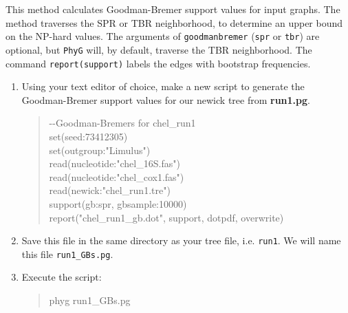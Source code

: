 \documentclass[11pt]{article}
\newcommand{\phyg}{\texttt{PhyG} }
\begin{document}
This method calculates Goodman-Bremer support values for input graphs. The 
method traverses the SPR or TBR neighborhood, to determine an upper bound 
on the NP-hard values. The arguments of \texttt{goodmanbremer} (\texttt{spr} or 
\texttt{tbr}) are optional, but \phyg will, by default, traverse the TBR neighborhood. 
The command \texttt{report(support)} labels the edges with bootstrap frequencies.

\begin{enumerate}
 
 \item Using your text editor of choice, make a new script to generate the 
 Goodman-Bremer  support values for our newick tree from \textbf{run1.pg}.
 
         \begin{quote}
	-\/-Goodman-Bremers for chel\_run1\\
	set(seed:73412305) \\
	set(outgroup:"Limulus") \\
	read(nucleotide:"chel\_16S.fas") \\
	read(nucleotide:"chel\_cox1.fas") \\
	read(newick:"chel\_run1.tre") \\
	support(gb:spr, gbsample:10000)\\
	report("chel\_run1\_gb.dot", support, dotpdf, overwrite)
        \end{quote}  
       
\item Save this file in the same directory as your tree file, i.e. \texttt{run1}.
We will name this file \texttt{run1\_GBs.pg}.

\item Execute the script:

	\begin{quote}
  	phyg run1\_GBs.pg
	\end{quote}
	

\end{enumerate}
\end{document}
